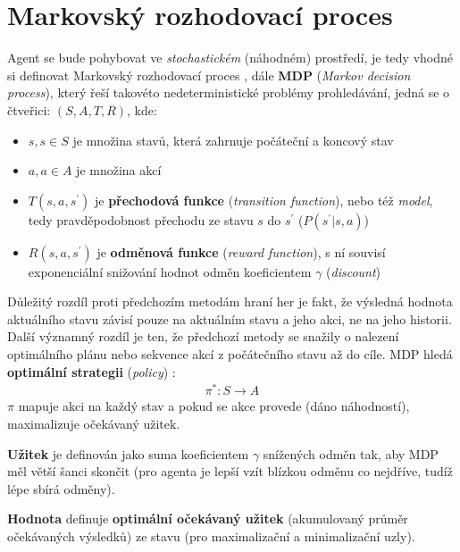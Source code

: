 \section{Markovský rozhodovací proces}
Agent se bude pohybovat ve \textit{stochastickém} (náhodném) prostředí, je tedy vhodné si definovat Markovský rozhodovací proces \cite{RLAprox}, dále \textbf{MDP} (\textit{Markov decision process}), který řeší takovéto nedeterministické problémy prohledávání, jedná se o čtveřici:
$(S,A,T,R)$, kde:
\begin{itemize}
\item $s, s \in S$ je množina stavů, která zahrnuje počáteční a koncový stav
\item $a, a \in A$ je množina akcí
\item $T(s,a,s^\prime)$ je \textbf{přechodová funkce} (\textit{transition function}), nebo též \textit{model}, tedy pravděpodobnost přechodu ze stavu $s$ do $s^\prime$ ($P(s^\prime| s, a) $)
\item $R(s,a,s^\prime)$ je  \textbf{odměnová funkce} (\textit{reward function}), s ní souvisí exponenciální snižování hodnot odměn koeficientem $\gamma$ (\textit{discount})
\end{itemize}
Důležitý rozdíl proti předchozím metodám hraní her je fakt, že výsledná hodnota aktuálního stavu závisí pouze na aktuálním stavu a jeho akci, ne na jeho historii.
Další významný rozdíl je ten, že předchozí metody se snažily o nalezení optimálního plánu nebo sekvence akcí z počátečního stavu až do cíle. MDP hledá \textbf{optimální strategii} (\textit{policy}) \cite{agents}:
\begin{align}
\pi^*: S \to A
\end{align}
$\pi$ mapuje akci na každý stav a pokud se akce provede (dáno náhodností), maximalizuje očekávaný užitek.

\textbf{Užitek} \cite{agents} je definován jako suma koeficientem $\gamma$ snížených odměn tak, aby MDP měl větší šanci skončit (pro agenta je lepší vzít blízkou odměnu co nejdříve, tudíž lépe sbírá odměny).

\textbf{Hodnota} \cite{agents} definuje \textbf{optimální očekávaný užitek} (akumulovaný průměr očekávaných výsledků) ze stavu (pro maximalizační a minimalizační uzly).

